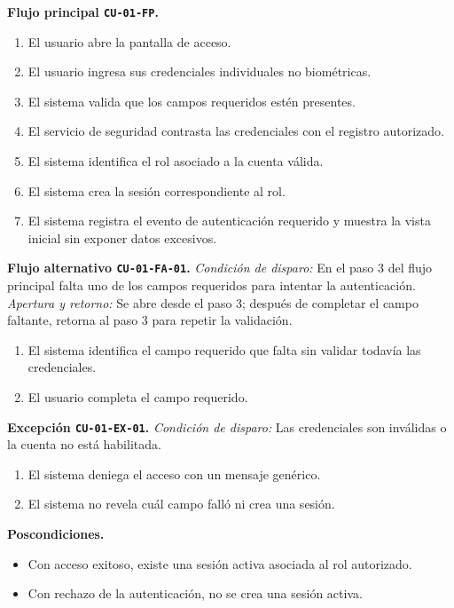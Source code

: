 \documentclass[11pt,a4paper,twoside]{article}
\begin{document}
\textbf{Flujo principal \texttt{CU-01-FP}.}
\begin{enumerate}
\item El usuario abre la pantalla de acceso.
\item El usuario ingresa sus credenciales individuales no biométricas.
\item El sistema valida que los campos requeridos estén presentes.
\item El servicio de seguridad contrasta las credenciales con el registro autorizado.
\item El sistema identifica el rol asociado a la cuenta válida.
\item El sistema crea la sesión correspondiente al rol.
\item El sistema registra el evento de autenticación requerido y muestra la vista inicial sin exponer datos excesivos.
\end{enumerate}

\textbf{Flujo alternativo \texttt{CU-01-FA-01}.} \textit{Condición de disparo:} En el paso 3 del flujo principal falta uno de los campos requeridos para intentar la autenticación. \textit{Apertura y retorno:} Se abre desde el paso 3; después de completar el campo faltante, retorna al paso 3 para repetir la validación.
\begin{enumerate}[label=\alph*.]
\item El sistema identifica el campo requerido que falta sin validar todavía las credenciales.
\item El usuario completa el campo requerido.
\end{enumerate}

\textbf{Excepción \texttt{CU-01-EX-01}.} \textit{Condición de disparo:} Las credenciales son inválidas o la cuenta no está habilitada.
\begin{enumerate}[label=\alph*.]
\item El sistema deniega el acceso con un mensaje genérico.
\item El sistema no revela cuál campo falló ni crea una sesión.
\end{enumerate}

\textbf{Poscondiciones.}
\begin{itemize}
\item Con acceso exitoso, existe una sesión activa asociada al rol autorizado.
\item Con rechazo de la autenticación, no se crea una sesión activa.
\end{itemize}
\end{document}
